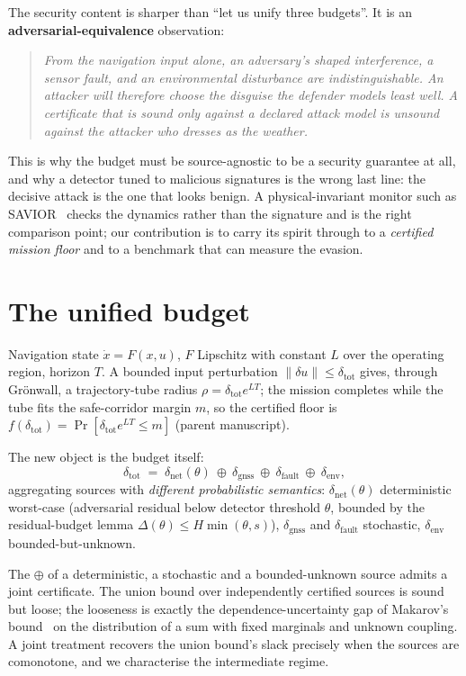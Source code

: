 \documentclass[11pt,a4paper]{article}
\newcommand{\dnet}{\delta_{\mathrm{net}}}
\newcommand{\dfault}{\delta_{\mathrm{fault}}}
\newcommand{\denv}{\delta_{\mathrm{env}}}
\newcommand{\dgnss}{\delta_{\mathrm{gnss}}}
\newcommand{\dtot}{\delta_{\mathrm{tot}}}
\begin{document}
The security content is sharper than ``let us unify three budgets''. It is an
\textbf{adversarial-equivalence} observation:

\begin{quote}\itshape
From the navigation input alone, an adversary's shaped interference, a sensor
fault, and an environmental disturbance are indistinguishable. An attacker will
therefore choose the disguise the defender models least well. A certificate that
is sound only against a declared attack model is unsound against the attacker who
dresses as the weather.
\end{quote}

\noindent
This is why the budget must be source-agnostic to be a security guarantee at all,
and why a detector tuned to malicious signatures is the wrong last line: the
decisive attack is the one that looks benign. A physical-invariant monitor such
as SAVIOR~\cite{quinonez2020savior} checks the dynamics rather than the signature
and is the right comparison point; our contribution is to carry its spirit
through to a \emph{certified mission floor} and to a benchmark that can measure
the evasion.

\section{The unified budget}
Navigation state $\dot x=F(x,u)$, $F$ Lipschitz with constant $L$ over the
operating region, horizon $T$. A bounded input perturbation $\|\delta u\|\le\dtot$
gives, through Gr\"onwall, a trajectory-tube radius $\rho=\dtot e^{LT}$; the
mission completes while the tube fits the safe-corridor margin $m$, so the
certified floor is $f(\dtot)=\Pr[\dtot e^{LT}\le m]$ (parent manuscript).

The new object is the budget itself:
\begin{equation}
\label{eq:budget}
\dtot \;=\; \dnet(\theta)\ \oplus\ \dgnss\ \oplus\ \dfault\ \oplus\ \denv ,
\end{equation}
aggregating sources with \emph{different probabilistic semantics}: $\dnet(\theta)$
deterministic worst-case (adversarial residual below detector threshold $\theta$,
bounded by the residual-budget lemma $\Delta(\theta)\le H\min(\theta,s)$),
$\dgnss$ and $\dfault$ stochastic, $\denv$ bounded-but-unknown.

\begin{proposition}
\label{pr:compose}
The $\oplus$ of a deterministic, a stochastic and a bounded-unknown source admits
a joint certificate. The union bound over independently certified sources is
sound but loose; the looseness is exactly the dependence-uncertainty gap of
Makarov's bound~\cite{makarov1981,embrechts2013var} on the distribution of a sum
with fixed marginals and unknown coupling. A joint treatment recovers the union
bound's slack precisely when the sources are comonotone, and we characterise the
intermediate regime.
\end{proposition}
\end{document}
